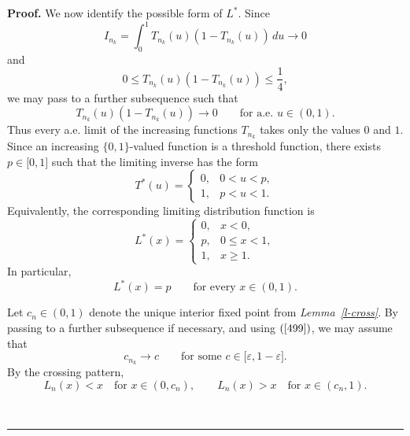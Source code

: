 \documentclass[onecolumn]{article}
\newenvironment{proof}[1][Proof]{\noindent\textbf{#1.} }{\ \rule{0.5em}{0.5em}}
\begin{document}
\begin{proof}
We now identify the possible form of $L^{\ast }$. Since 
\begin{equation}
I_{n_{k}}=\int_{0}^{1}T_{n_{k}}(u)(1-T_{n_{k}}(u))\,du\rightarrow 0
\label{502bb}
\end{equation}%
and 
\begin{equation}
0\leq T_{n_{k}}(u)(1-T_{n_{k}}(u))\leq \frac{1}{4},  \label{502bbb}
\end{equation}%
we may pass to a further subsequence such that 
\begin{equation}
T_{n_{k}}(u)(1-T_{n_{k}}(u))\rightarrow 0\qquad \text{for a.e. }u\in (0,1).
\label{502c}
\end{equation}%
Thus every a.e. limit of the increasing functions $T_{n_{k}}$ takes only the
values $0$ and $1$. Since an increasing $\{0,1\}$-valued function is a
threshold function, there exists $p\in \lbrack 0,1]$ such that the limiting
inverse has the form 
\begin{equation}
T^{\ast }(u)=%
\begin{cases}
0, & 0<u<p, \\ 
1, & p<u<1.%
\end{cases}
\label{502d}
\end{equation}%
Equivalently, the corresponding limiting distribution function is 
\begin{equation}
L^{\ast }(x)=%
\begin{cases}
0, & x<0, \\ 
p, & 0\leq x<1, \\ 
1, & x\geq 1.%
\end{cases}
\label{502e}
\end{equation}%
In particular, 
\begin{equation}
L^{\ast }(x)=p\qquad \text{for every }x\in (0,1).  \label{502f}
\end{equation}

Let $c_{n}\in (0,1)$ denote the unique interior fixed point from \textit{%
Lemma~\ref{l-cross}}. By passing to a further subsequence if necessary, and
using $(\ref{499})$, we may assume that 
\begin{equation}
c_{n_{k}}\rightarrow c\qquad \text{for some }c\in \lbrack \varepsilon
,1-\varepsilon ].  \label{502g}
\end{equation}%
By the crossing pattern, 
\begin{equation}
L_{n}(x)<x\quad \text{for }x\in (0,c_{n}),\qquad L_{n}(x)>x\quad \text{for }%
x\in (c_{n},1).  \label{502h}
\end{equation}


\end{proof}
\end{document}

